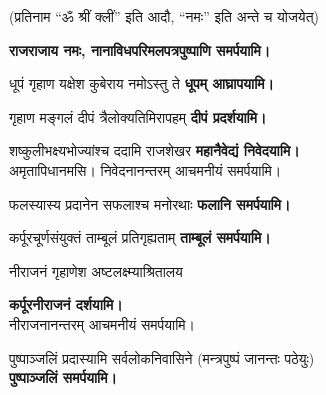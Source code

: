 (प्रतिनाम ``ॐ श्रीं क्लीं'' इति आदौ, ``नमः'' इति अन्ते च योजयेत्)

\begingroup
\centering
\setlength{\columnseprule}{1pt}
\let\chapt\sect

\endgroup

\textbf{राजराजाय नमः, नानाविधपरिमलपत्रपुष्पाणि समर्पयामि।}

\begin{center}
{धूपं गृहाण यक्षेश कुबेराय नमोऽस्तु ते}
\textbf{\devAya{} धूपम् आघ्रापयामि।}\medskip

{गृहाण मङ्गलं दीपं त्रैलोक्यतिमिरापहम्}
\textbf{\devAya{} दीपं प्रदर्शयामि।}\medskip

{शष्कुलीभक्ष्यभोज्यांश्च ददामि राजशेखर}
\textbf{\devAya{} महानैवेद्यं निवेदयामि।}\\
अमृतापिधानमसि। निवेदनानन्तरम् आचमनीयं समर्पयामि।\medskip

{फलस्यास्य प्रदानेन सफलाश्च मनोरथाः}
\textbf{\devAya{} फलानि समर्पयामि।}\medskip

{कर्पूरचूर्णसंयुक्तं ताम्बूलं प्रतिगृह्यताम्}
\textbf{\devAya{} ताम्बूलं समर्पयामि।}\medskip

{नीराजनं गृहाणेश अष्टलक्ष्म्याश्रितालय}


\textbf{\devAya{} कर्पूरनीराजनं दर्शयामि।}\\
नीराजनानन्तरम् आचमनीयं समर्पयामि।\medskip

{पुष्पाञ्जलिं प्रदास्यामि सर्वलोकनिवासिने}
(मन्त्रपुष्पं जानन्तः पठेयुः)\\
\textbf{\devAya{} पुष्पाञ्जलिं समर्पयामि।}


\end{center}
